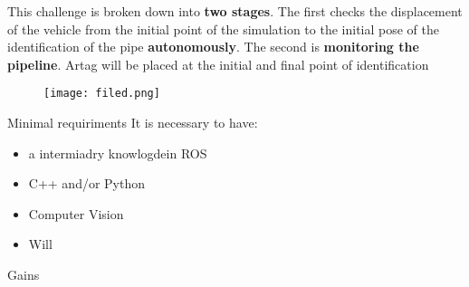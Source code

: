 \begin{frame}{}
    \transdissolve[duration=0.5]
   
    \begin{center}
    \end{center}
\end{frame}



\begin{frame}{}
    This challenge is broken down into \textbf{two stages}. The first checks the displacement of the vehicle from the initial point of the simulation to the initial pose of the identification of the pipe \textbf{autonomously}. The second is \textbf{monitoring the pipeline}. Artag will be placed at the initial and final point of identification



    \begin{center}
        \begin{figure}
            \texttt{[image: filed.png]}               
           
        \end{figure}
    
        \end{center}
   
\end{frame}

\begin{frame}[t]{Minimal requiriments}
    It is necessary to have:
    \begin{itemize}
        \item a intermiadry knowlogdein ROS 
        \item C++ and/or Python
        \item Computer Vision
        \item Will
    \end{itemize} 
\end{frame}

\begin{frame}{Gains}
   
\end{frame}

